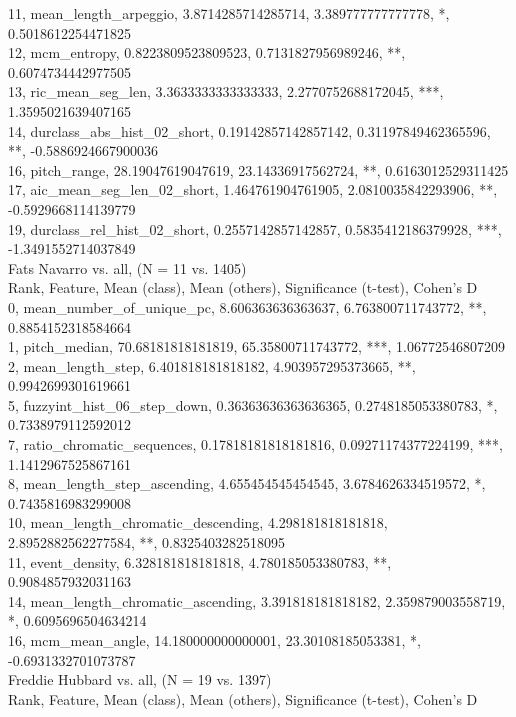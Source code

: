 11, mean_length_arpeggio, 3.8714285714285714, 3.389777777777778, *, 0.5018612254471825\\
12, mcm_entropy, 0.8223809523809523, 0.7131827956989246, **, 0.6074734442977505\\
13, ric_mean_seg_len, 3.3633333333333333, 2.2770752688172045, ***, 1.3595021639407165\\
14, durclass_abs_hist_02_short, 0.19142857142857142, 0.31197849462365596, **, -0.5886924667900036\\
16, pitch_range, 28.19047619047619, 23.14336917562724, **, 0.6163012529311425\\
17, aic_mean_seg_len_02_short, 1.464761904761905, 2.0810035842293906, **, -0.5929668114139779\\
19, durclass_rel_hist_02_short, 0.2557142857142857, 0.5835412186379928, ***, -1.3491552714037849\\
Fats Navarro vs. all, (N = 11 vs. 1405)\\
Rank, Feature, Mean (class), Mean (others), Significance (t-test), Cohen's D\\
0, mean_number_of_unique_pc, 8.606363636363637, 6.763800711743772, **, 0.8854152318584664\\
1, pitch_median, 70.68181818181819, 65.35800711743772, ***, 1.06772546807209\\
2, mean_length_step, 6.401818181818182, 4.903957295373665, **, 0.9942699301619661\\
5, fuzzyint_hist_06_step_down, 0.36363636363636365, 0.2748185053380783, *, 0.7338979112592012\\
7, ratio_chromatic_sequences, 0.17818181818181816, 0.09271174377224199, ***, 1.1412967525867161\\
8, mean_length_step_ascending, 4.655454545454545, 3.6784626334519572, *, 0.7435816983299008\\
10, mean_length_chromatic_descending, 4.298181818181818, 2.8952882562277584, **, 0.8325403282518095\\
11, event_density, 6.328181818181818, 4.780185053380783, **, 0.9084857932031163\\
14, mean_length_chromatic_ascending, 3.391818181818182, 2.359879003558719, *, 0.6095696504634214\\
16, mcm_mean_angle, 14.180000000000001, 23.30108185053381, *, -0.6931332701073787\\
Freddie Hubbard vs. all, (N = 19 vs. 1397)\\
Rank, Feature, Mean (class), Mean (others), Significance (t-test), Cohen's D\\
